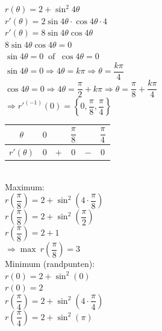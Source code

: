 \documentclass[a4paper]{article}
\begin{document}
\begin{enumerate}
$r(\theta)=2+\sin^2 4\theta$\\

$r'(\theta)=2\sin 4\theta \cdot \cos 4\theta \cdot 4$\\

$r'(\theta)=8\sin 4\theta \cos 4\theta$\\

$8\sin 4\theta \cos 4\theta=0$\\

$\sin 4\theta=0 \ \text{ of } \ \cos 4\theta=0$\\

$\sin 4\theta=0 \Rightarrow 4\theta=k\pi \Rightarrow \theta=\dfrac{k\pi}{4}$\\

$\cos 4\theta=0 \Rightarrow 4\theta=\dfrac{\pi}{2}+k\pi \Rightarrow \theta=\dfrac{\pi}{8}+\dfrac{k\pi}{4}$\\

$\Rightarrow r'^{(-1)}(0)=\left\{0,\dfrac{\pi}{8},\dfrac{\pi}{4}\right\}$\\

\begin{tabular}{c|ccccc}
$\theta$ & $0$ &  & $\dfrac{\pi}{8}$ &  & $\dfrac{\pi}{4}$ \\ \hline
$r'(\theta)$ & $0$ & $+$ & $0$ & $-$ & $0$
\end{tabular}\\

Maximum:\\

$r\left(\dfrac{\pi}{8}\right)=2+\sin^2\left(4\cdot\dfrac{\pi}{8}\right)$\\

$r\left(\dfrac{\pi}{8}\right)=2+\sin^2\left(\dfrac{\pi}{2}\right)$\\

$r\left(\dfrac{\pi}{8}\right)=2+1$\\

$\Rightarrow \max\ r\left(\dfrac{\pi}{8}\right)=3$\\

Minimum (randpunten):\\

$r(0)=2+\sin^2(0)$\\

$r(0)=2$\\

$r\left(\dfrac{\pi}{4}\right)=2+\sin^2\left(4\cdot\dfrac{\pi}{4}\right)$\\

$r\left(\dfrac{\pi}{4}\right)=2+\sin^2(\pi)$\\


\end{enumerate}
\end{document}
